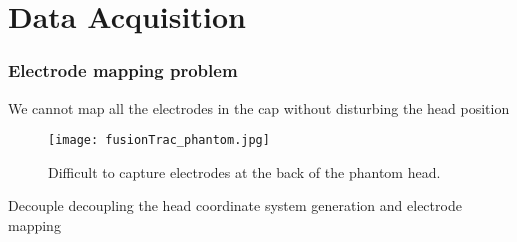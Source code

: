\section{Data Acquisition}
\begin{frame}
	\frametitle{Electrode mapping problem}
	We cannot map all the electrodes in the cap without disturbing the head position
	\begin{figure}[hbt!]
		\centering
		\texttt{[image: fusionTrac\_phantom.jpg]}
		\caption{Difficult to capture electrodes at the back of the phantom head.} 
		\label{fig:fusionTrac_phantom}
	\end{figure}
\begin{block}{Decouple}
	decoupling the head coordinate system generation and electrode mapping 
\end{block}
\end{frame}


